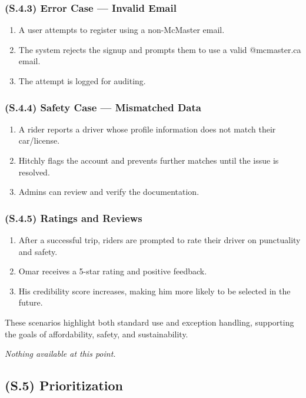 \documentclass[12pt,letterpaper]{article}
\begin{document}
\subsubsection{(S.4.3) Error Case — Invalid Email} %
\begin{enumerate}
    \item A user attempts to register using a non-McMaster email.
    \item The system rejects the signup and prompts them to use a valid @mcmaster.ca email.
    \item The attempt is logged for auditing.
\end{enumerate}

\subsubsection{(S.4.4) Safety Case — Mismatched Data} %
\begin{enumerate}
    \item A rider reports a driver whose profile information does not match their car/license.
    \item Hitchly flags the account and prevents further matches until the issue is resolved.
    \item Admins can review and verify the documentation.
\end{enumerate}

\subsubsection{(S.4.5) Ratings and Reviews} %
\begin{enumerate}
    \item After a successful trip, riders are prompted to rate their driver on punctuality and safety.
    \item Omar receives a 5-star rating and positive feedback.
    \item His credibility score increases, making him more likely to be selected in the future.
\end{enumerate}

These scenarios highlight both standard use and exception handling, supporting the goals of affordability, safety, and sustainability.

\textit{Nothing available at this point.}

\subsection{(S.5) Prioritization}
\end{document}
